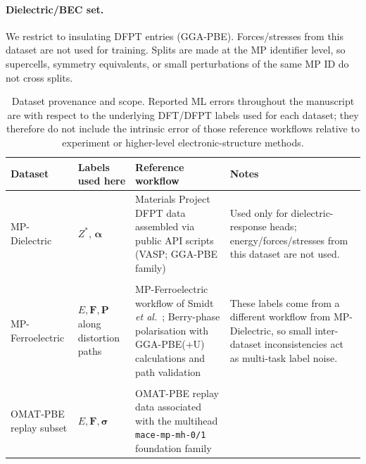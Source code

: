 \documentclass[aps,physrev,graphicx,amsmath,amssymb,reprint]{revtex4-2} %
\begin{document}
\paragraph*{Dielectric/BEC set.} We restrict to insulating DFPT entries (GGA-PBE). Forces/stresses from this dataset are not used for training. Splits are made at the MP identifier level, so supercells, symmetry equivalents, or small perturbations of the same MP ID do not cross splits.
\\

\begin{table}[t]
  \centering
  \small
  \caption{Dataset provenance and scope. Reported ML errors throughout the manuscript are with respect to the underlying DFT/DFPT labels used for each dataset; they therefore do not include the intrinsic error of those reference workflows relative to experiment or higher-level electronic-structure methods.}
  \label{tab:dataset_provenance}
  \begin{tabular*}{\textwidth}{@{\extracolsep{\fill}}l l l l@{}}
  \toprule
  \parbox[t]{2.2cm}{\raggedright Dataset} &
  \parbox[t]{2.6cm}{\raggedright Labels used here} &
  \parbox[t]{4.0cm}{\raggedright Reference workflow} &
  \parbox[t]{6.0cm}{\raggedright Notes} \\
  \midrule
  \parbox[t]{2.2cm}{\raggedright MP-Dielectric} &
  \parbox[t]{2.6cm}{\raggedright $Z^*$, $\boldsymbol\alpha$} &
  \parbox[t]{4.0cm}{\raggedright Materials Project DFPT data assembled via public API scripts (VASP; GGA-PBE family)} &
  \parbox[t]{6.0cm}{\raggedright Used only for dielectric-response heads; energy/forces/stresses from this dataset are not used.} \\ \\
  \parbox[t]{2.2cm}{\raggedright MP-Ferroelectric} &
  \parbox[t]{2.6cm}{\raggedright $E,\mathbf F,\mathbf P$ along distortion paths} &
  \parbox[t]{4.0cm}{\raggedright MP-Ferroelectric workflow of Smidt \emph{et al.}~\cite{smidt-2020-ferrodb}; Berry-phase polarisation with GGA-PBE(+U) calculations and path validation} &
  \parbox[t]{6.0cm}{\raggedright These labels come from a different workflow from MP-Dielectric, so small inter-dataset inconsistencies act as multi-task label noise.} \\ \\
  \parbox[t]{2.2cm}{\raggedright OMAT-PBE replay subset} &
  \parbox[t]{2.6cm}{\raggedright $E,\mathbf F,\boldsymbol\sigma$} &
  \parbox[t]{4.0cm}{\raggedright OMAT-PBE replay data associated with the multihead \texttt{mace-mp-mh-0/1} foundation family~\cite{batatia2025foundationmodelatomisticmaterials}} &

\end{tabular*}
\end{table}
\end{document}
